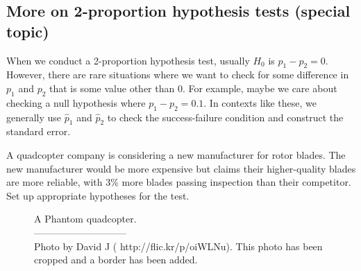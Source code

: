 \D{\newpage}

\subsection{More on 2-proportion hypothesis tests (special topic)}

When we conduct a 2-proportion hypothesis test,
usually $H_0$ is $p_1 - p_2 = 0$. However, there are rare
situations where we want to check for some difference in
$p_1$ and $p_2$ that is some value other than 0.
For example, maybe we care about checking a null hypothesis
where $p_1 - p_2 = 0.1$. %
In contexts like these, we generally use $\hat{p}_1$ and
$\hat{p}_2$ to check the success-failure condition and
construct the standard error.

\begin{exercisewrap}
\begin{nexercise}
\label{carWheelBladeManufacturer}%
A quadcopter company is considering a new manufacturer
for rotor blades.
The new manufacturer would be more expensive but claims
their higher-quality blades are more reliable,
with 3\% more blades passing inspection than their
competitor.
Set up appropriate hypotheses for the test.\footnotemark
\end{nexercise}
\end{exercisewrap}

\setlength{\captionwidth}{85mm}

\begin{figure}[h]
\centering
{}
\caption{A Phantom quadcopter.\vspace{-1mm} \\
   -----------------------------\vspace{-2mm}\\
   {\footnotesize Photo by David J
   (
       {http://flic.kr/p/oiWLNu}).
   This photo has been cropped and a border has been added.}}
\label{quadcopter_david_j}
\end{figure}

